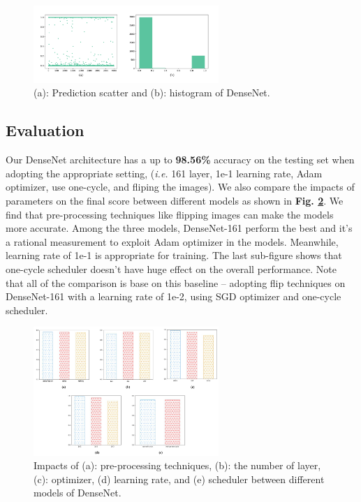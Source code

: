 \documentclass[10pt,twocolumn,letterpaper]{article}
\begin{document}
\begin{figure}[h]
\centering
\includegraphics[width=7cm]{dense_best.pdf}
\caption{(a): Prediction scatter and (b): histogram of \textsf{DenseNet}.}
\label{denseresults}
\end{figure}

\subsection{Evaluation}

Our \textsf{DenseNet} architecture has a up to \textbf{98.56\%} accuracy on the testing set when adopting the appropriate setting, (\textit{i.e.} 161 layer, 1e-1 learning rate, Adam optimizer, use one-cycle, and fliping the images). We also compare the impacts of parameters on the final score between different models as shown in \textbf{Fig. \ref{densecompare}}. We find that pre-processing techniques like flipping images can make the models more accurate. Among the three models, \textsf{DenseNet-161} perform the best and it's a rational measurement to exploit Adam optimizer in the models. Meanwhile, learning rate of 1e-1 is appropriate for training. The last sub-figure shows that one-cycle scheduler doesn't have huge effect on the overall performance. Note that all of the comparison is base on this baseline -- adopting flip techniques on \textsf{DenseNet-161} with a learning rate of 1e-2, using SGD optimizer and one-cycle scheduler.

\begin{figure}[h]
\centering
\includegraphics[width=7cm]{dense.pdf}
\caption{Impacts of (a): pre-processing techniques, (b): the number of layer, (c): optimizer, (d) learning rate, and (e) scheduler between different models of \textsf{DenseNet}.}
\label{densecompare}
\end{figure}
\end{document}
